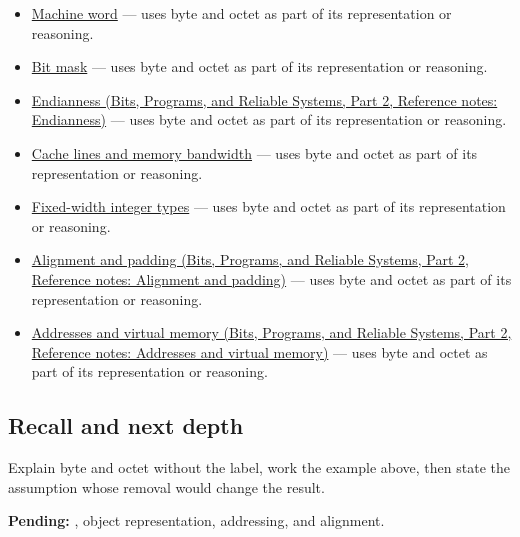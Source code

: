 \hypertarget{appendix-5bee2df85484-used-by}{}

\begin{itemize}
\tightlist
\item
  \hyperref[appendix-d67a19507dc5]{Machine word} --- uses byte and octet as part of its representation or reasoning.
\item
  \hyperref[appendix-dbe5905163c2]{Bit mask} --- uses byte and octet as part of its representation or reasoning.
\item
  \href{../01-Bits-Programs-and-Reliable-Systems-P02/main.pdf\#nameddest=appendix-bc07c3d25b18}{Endianness (Bits, Programs, and Reliable Systems, Part 2, Reference notes: Endianness)} --- uses byte and octet as part of its representation or reasoning.
\item
  \hyperref[appendix-e4ccdbab8320]{Cache lines and memory bandwidth} --- uses byte and octet as part of its representation or reasoning.
\item
  \hyperref[appendix-cc04044b5782]{Fixed-width integer types} --- uses byte and octet as part of its representation or reasoning.
\item
  \href{../01-Bits-Programs-and-Reliable-Systems-P02/main.pdf\#nameddest=appendix-a1f7c53b4742}{Alignment and padding (Bits, Programs, and Reliable Systems, Part 2, Reference notes: Alignment and padding)} --- uses byte and octet as part of its representation or reasoning.
\item
  \href{../01-Bits-Programs-and-Reliable-Systems-P02/main.pdf\#nameddest=appendix-18ee4f913c3c}{Addresses and virtual memory (Bits, Programs, and Reliable Systems, Part 2, Reference notes: Addresses and virtual memory)} --- uses byte and octet as part of its representation or reasoning.
\end{itemize}

\subsection{Recall and next depth}\label{appendix-5bee2df85484-recall-and-next-depth}

\hypertarget{appendix-5bee2df85484-recall-and-next-depth}{}

Explain byte and octet without the label, work the example above, then state the assumption whose removal would change the result.

\textbf{Pending:} , object representation, addressing, and alignment.

